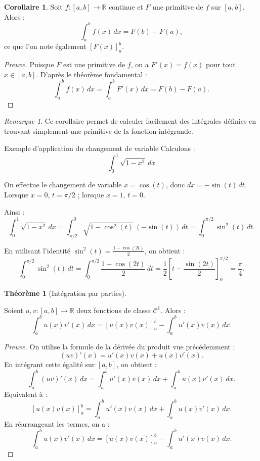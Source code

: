 \documentclass{report} %
\theoremstyle{definition}  %
\newtheorem{corollary}{Corollaire}[chapter] %
\theoremstyle{plain} %
\newtheorem{theorem}{Théorème}[chapter]
\theoremstyle{remark} %
\newtheorem*{remark}{Remarque} %
\begin{document}
\begin{corollary}
Soit \(f : [a,b] \to \mathbb{R}\) continue et \(F\) une primitive de \(f\) sur \([a,b]\).  
Alors :
\[
\int_a^b f(x)\, dx = F(b) - F(a),
\]
ce que l’on note également \([F(x)]_a^b\).
\end{corollary}
\medskip
\begin{proof}[Preuve]
Puisque \(F\) est une primitive de \(f\), on a \(F'(x) = f(x)\) pour tout \(x \in [a,b]\).  
D'après le théorème fondamental :
\[
\int_a^b f(x)\, dx = \int_a^b F'(x)\, dx = F(b) - F(a).
\]
\end{proof}

\begin{remark}
Ce corollaire permet de calculer facilement des intégrales définies en trouvant simplement une primitive de la fonction intégrande.
\end{remark}

\noindent
Exemple d'application du changement de variable
Calculons :
\[
\int_0^1 \sqrt{1-x^2}\, dx
\]

\noindent
On effectue le changement de variable \(x = \cos(t)\), donc \(dx = -\sin(t)\, dt\).  
Lorsque \(x = 0\), \(t = \pi/2\) ; lorsque \(x = 1\), \(t = 0\).  

Ainsi :
\[
\int_0^1 \sqrt{1-x^2}\, dx
= \int_{\pi/2}^{0} \sqrt{1-\cos^2(t)}\, (-\sin(t))\, dt
= \int_0^{\pi/2} \sin^2(t)\, dt.
\]

En utilisant l'identité \(\sin^2(t) = \frac{1 - \cos(2t)}{2}\), on obtient :
\[
\int_0^{\pi/2} \sin^2(t)\, dt
= \int_0^{\pi/2} \frac{1 - \cos(2t)}{2}\, dt
= \frac{1}{2} \left[ t - \frac{\sin(2t)}{2} \right]_0^{\pi/2}
= \frac{\pi}{4}.
\]
\medskip

\begin{theorem}
[Intégration par parties]

\end{theorem}
Soient \(u, v : [a,b] \to \mathbb{R}\) deux fonctions de classe \(\mathcal{C}^1\).
Alors :
\[
\int_a^b u(x)v'(x)\, dx = [u(x)v(x)]_a^b - \int_a^b u'(x)v(x)\, dx.
\]
\medskip

\begin{proof}[Preuve]
On utilise la formule de la dérivée du produit vue précédemment :
\[(uv)'(x) = u'(x)v(x) + u(x)v'(x).\]
En intégrant cette égalité sur \([a,b]\), on obtient :
\[
\int_a^b (uv)'(x)\, dx = \int_a^b u'(x)v(x)\, dx + \int_a^b u(x)v'(x)\, dx.
\]
Equivalent à :
\[
[u(x)v(x)]_a^b = \int_a^b u'(x)v(x)\, dx + \int_a^b u(x)v'(x)\, dx.
\]
En réarrangeant les termes, on a :
\[
\int_a^b u(x)v'(x)\, dx = [u(x)v(x)]_a^b - \int_a^b u'(x)v(x)\, dx.
\]
\end{proof}
\end{document}
